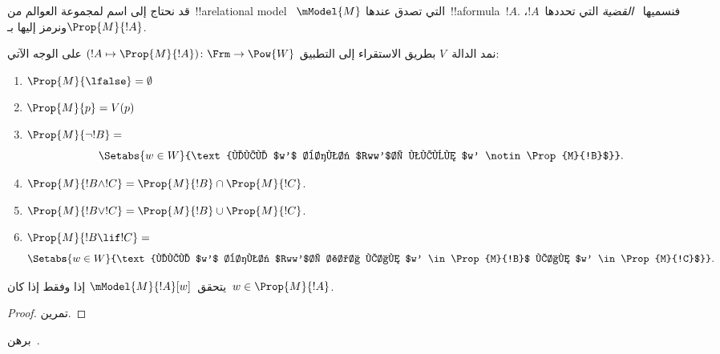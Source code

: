 \documentclass[../../../include/open-logic-section]{subfiles}
\begin{document}


قد نحتاج إلى اسم لمجموعة العوالم من~!!a{relational model}
~$\mModel{M}$ التي تصدق عندها~!!a{formula}~$!A$. فنسميها
~\emph{القضية} التي تحددها~$!A$، ونرمز إليها بـ$\Prop{M}{!A}$.

\begin{defn}
  نمد الدالة~$V$ بطريق الاستقراء إلى التطبيق
  $(!A \mapsto \Prop{M}{!A}) \colon \Frm \to \Pow{W}$ على الوجه الآتي:
  \begin{enumerate}
  \item $\Prop{M}{\lfalse} = \emptyset$
  \item $\Prop{M}{p} = V(p)$
  \item $\Prop{M}{\lnot !B} = {}$
    \[
      \Setabs{w \in W}{\text{لكل $w'$ بحيث $Rww'$، يكون $w'
          \notin \Prop{M}{!B}$}}.
    \]
  \item $\Prop{M}{!B \land !C} = \Prop{M}{!B} \cap \Prop{M}{!C}$.
  \item $\Prop{M}{!B \lor !C} = \Prop{M}{!B} \cup \Prop{M}{!C}$.
  \item $\Prop{M}{!B \lif !C} = {}$
    \[
      \Setabs{w \in W}{\text{لكل $w'$ بحيث $Rww'$، إذا كان $w'
          \in \Prop{M}{!B}$ كان $w' \in \Prop{M}{!C}$}}.
    \]
  \end{enumerate}
\end{defn}

\begin{prop}
  يتحقق~$\mModel{M}{!A}[w]$ إذا وفقط إذا كان~$w \in \Prop{M}{!A}$.
\end{prop}

\begin{proof}
  تمرين.
\end{proof}

\begin{prob}
  برهن~.
\end{prob}
\end{document}
